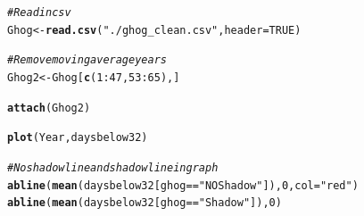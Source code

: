 \documentclass[12pt]{article}\usepackage[]{graphicx}\usepackage[]{color}
\makeatletter
\newcommand{\hlnum}[1]{\textcolor[rgb]{0.686,0.059,0.569}{#1}}%
\newcommand{\hlstr}[1]{\textcolor[rgb]{0.192,0.494,0.8}{#1}}%
\newcommand{\hlcom}[1]{\textcolor[rgb]{0.678,0.584,0.686}{\textit{#1}}}%
\newcommand{\hlopt}[1]{\textcolor[rgb]{0,0,0}{#1}}%
\newcommand{\hlstd}[1]{\textcolor[rgb]{0.345,0.345,0.345}{#1}}%
\newcommand{\hlkwb}[1]{\textcolor[rgb]{0.69,0.353,0.396}{#1}}%
\newcommand{\hlkwc}[1]{\textcolor[rgb]{0.333,0.667,0.333}{#1}}%
\newcommand{\hlkwd}[1]{\textcolor[rgb]{0.737,0.353,0.396}{\textbf{#1}}}%
\newenvironment{kframe}{%
 \def\at@end@of@kframe{}%
 \ifinner\ifhmode%
  \def\at@end@of@kframe{\end{minipage}}%
  \begin{minipage}{\columnwidth}%
 \fi\fi%
 \def\FrameCommand##1{\hskip\@totalleftmargin \hskip-\fboxsep
 \colorbox{shadecolor}{##1}\hskip-\fboxsep
     \hskip-\linewidth \hskip-\@totalleftmargin \hskip\columnwidth}%
 \MakeFramed {\advance\hsize-\width
   \@totalleftmargin\z@ \linewidth\hsize
   \@setminipage}}%
 {\par\unskip\endMakeFramed%
 \at@end@of@kframe}
\newenvironment{knitrout}{}{} %
\makeatother
\begin{document}
\begin{knitrout}
\color{fgcolor}\begin{kframe}
\begin{alltt}
\hlcom{# Read in csv}
\hlstd{Ghog}\hlkwb{<-}\hlkwd{read.csv}\hlstd{(}\hlstr{"./ghog_clean.csv"}\hlstd{,}\hlkwc{header}\hlstd{=}\hlnum{TRUE}\hlstd{)}

\hlcom{# Remove moving average years}
\hlstd{Ghog2} \hlkwb{<-} \hlstd{Ghog[}\hlkwd{c}\hlstd{(}\hlnum{1}\hlopt{:}\hlnum{47}\hlstd{,}\hlnum{53}\hlopt{:}\hlnum{65}\hlstd{),]}

\hlkwd{attach}\hlstd{(Ghog2)}

\hlkwd{plot}\hlstd{(Year,daysbelow32 )}

\hlcom{# No shadow line and shadow line in graph}
\hlkwd{abline}\hlstd{(}\hlkwd{mean}\hlstd{(daysbelow32[ghog}\hlopt{==}\hlstr{"NOShadow"}\hlstd{]),}\hlnum{0}\hlstd{,}\hlkwc{col}\hlstd{=}\hlstr{"red"}\hlstd{)}
\hlkwd{abline}\hlstd{(}\hlkwd{mean}\hlstd{(daysbelow32[ghog}\hlopt{==}\hlstr{"Shadow"}\hlstd{]),}\hlnum{0}\hlstd{)}


\end{alltt}
\end{kframe}
\end{knitrout}
\end{document}
